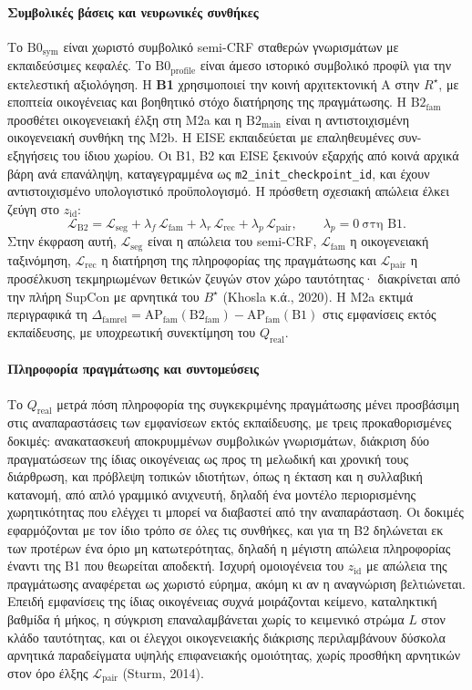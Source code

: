 \documentclass[a4paper]{article}
\newcommand{\Rs}{\ensuremath{R^{\star}}}
\newcommand{\Qreal}{\ensuremath{Q_{\mathrm{real}}}}
\begin{document}
\paragraph{Συμβολικές βάσεις και νευρωνικές συνθήκες}
Το $\mathrm{B0}_{\mathrm{sym}}$ είναι χωριστό συμβολικό semi-CRF σταθερών γνωρισμάτων με εκπαιδεύσιμες κεφαλές. Το $\mathrm{B0}_{\mathrm{profile}}$ είναι άμεσο ιστορικό συμβολικό προφίλ για την εκτελεστική αξιολόγηση. Η \textbf{B1} χρησιμοποιεί την κοινή αρχιτεκτονική A στην $\Rs$, με εποπτεία οικογένειας και βοηθητικό στόχο διατήρησης της πραγμάτωσης. Η $\mathrm{B2}_{\mathrm{fam}}$ προσθέτει οικογενειακή έλξη στη Μ2a και η $\mathrm{B2}_{\mathrm{main}}$ είναι η αντιστοιχισμένη οικογενειακή συνθήκη της Μ2b. Η EISE εκπαιδεύεται με επαληθευμένες συν-εξηγήσεις του ίδιου χωρίου. Οι B1, B2 και EISE ξεκινούν εξαρχής από κοινά αρχικά βάρη ανά επανάληψη, καταγεγραμμένα ως \texttt{m2\_init\_checkpoint\_id}, και έχουν αντιστοιχισμένο υπολογιστικό προϋπολογισμό. Η πρόσθετη σχεσιακή απώλεια έλκει ζεύγη στο $z_{\mathrm{id}}$:
\[
\mathcal L_{\mathrm{B2}}=\mathcal L_{\mathrm{seg}}+\lambda_f\,\mathcal L_{\mathrm{fam}}+\lambda_r\,\mathcal L_{\mathrm{rec}}+\lambda_p\,\mathcal L_{\mathrm{pair}},\qquad \lambda_p=0\ \text{στη B1}.
\]
Στην έκφραση αυτή, $\mathcal L_{\mathrm{seg}}$ είναι η απώλεια του semi-CRF, $\mathcal L_{\mathrm{fam}}$ η οικογενειακή ταξινόμηση, $\mathcal L_{\mathrm{rec}}$ η διατήρηση της πληροφορίας της πραγμάτωσης και $\mathcal L_{\mathrm{pair}}$ η προσέλκυση τεκμηριωμένων θετικών ζευγών στον χώρο ταυτότητας· διακρίνεται από την πλήρη SupCon με αρνητικά του $B^\star$ (Khosla κ.ά., 2020). Η Μ2a εκτιμά περιγραφικά τη $\Delta_{\mathrm{famrel}}=\mathrm{AP}_{\mathrm{fam}}(\mathrm{B2}_{\mathrm{fam}})-\mathrm{AP}_{\mathrm{fam}}(\mathrm{B1})$ στις εμφανίσεις εκτός εκπαίδευσης, με υποχρεωτική συνεκτίμηση του $\Qreal$.

\paragraph{Πληροφορία πραγμάτωσης και συντομεύσεις}
Το $\Qreal$ μετρά πόση πληροφορία της συγκεκριμένης πραγμάτωσης μένει προσβάσιμη στις αναπαραστάσεις των εμφανίσεων εκτός εκπαίδευσης, με τρεις προκαθορισμένες δοκιμές: ανακατασκευή αποκρυμμένων συμβολικών γνωρισμάτων, διάκριση δύο πραγματώσεων της ίδιας οικογένειας ως προς τη μελωδική και χρονική τους διάρθρωση, και πρόβλεψη τοπικών ιδιοτήτων, όπως η έκταση και η συλλαβική κατανομή, από απλό γραμμικό ανιχνευτή, δηλαδή ένα μοντέλο περιορισμένης χωρητικότητας που ελέγχει τι μπορεί να διαβαστεί από την αναπαράσταση. Οι δοκιμές εφαρμόζονται με τον ίδιο τρόπο σε όλες τις συνθήκες, και για τη B2 δηλώνεται εκ των προτέρων ένα όριο μη κατωτερότητας, δηλαδή η μέγιστη απώλεια πληροφορίας έναντι της B1 που θεωρείται αποδεκτή. Ισχυρή ομοιογένεια του $z_{\mathrm{id}}$ με απώλεια της πραγμάτωσης αναφέρεται ως χωριστό εύρημα, ακόμη κι αν η αναγνώριση βελτιώνεται. Επειδή εμφανίσεις της ίδιας οικογένειας συχνά μοιράζονται κείμενο, καταληκτική βαθμίδα ή μήκος, η σύγκριση επαναλαμβάνεται χωρίς το κειμενικό στρώμα $L$ στον κλάδο ταυτότητας, και οι έλεγχοι οικογενειακής διάκρισης περιλαμβάνουν δύσκολα αρνητικά παραδείγματα υψηλής επιφανειακής ομοιότητας, χωρίς προσθήκη αρνητικών στον όρο έλξης $\mathcal L_{\mathrm{pair}}$ (Sturm, 2014).
\end{document}
